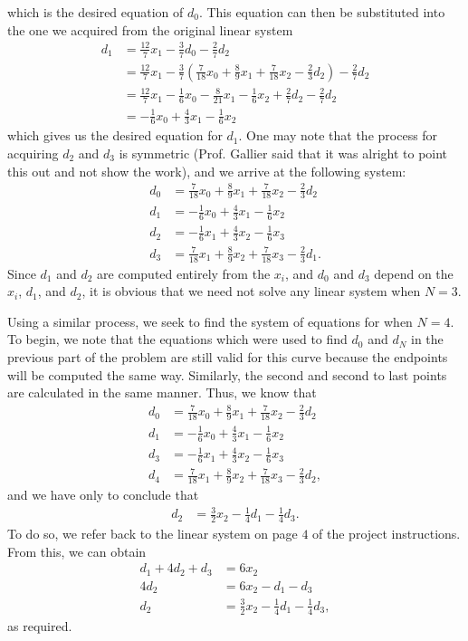 \documentclass[paper=a4, fontsize=11pt]{scrartcl} %
\begin{document}
which is the desired equation of $d_0$. This equation can then be substituted into the one we acquired from the original linear system
\begin{align*}
    d_1 &=
    \frac{12}{7}x_1 - \frac{3}{7}d_0 - \frac{2}{7} d_2 \\
    &=
    \frac{12}{7}x_1 - \frac{3}{7}(\frac{7}{18}x_0 + \frac{8}{9}x_1 +         \frac{7}{18}x_2 - \frac{2}{3}d_2) - \frac{2}{7} d_2 \\
    &=
    \frac{12}{7}x_1 - \frac{1}{6}x_0 - \frac{8}{21}x_1 - \frac{1}        {6}x_2     + \frac{2}{7}d_2 - \frac{2}{7} d_2 \\
    &=
    - \frac{1}{6}x_0 + \frac{4}{3}x_1 - \frac{1}{6}x_2
\end{align*}
which gives us the desired equation for $d_1$. One may note that the process
for acquiring $d_2$ and $d_3$ is symmetric (Prof. Gallier said that it was
alright to point this out and not show the work), and we arrive at the
following system:
\begin{align*}
    d_0 &=
    \frac{7}{18}x_0 +\frac{8}{9}x_1 +\frac{7}{18}x_2 -\frac{2}{3}d_2\\
    d_1 &=
    -\frac{1}{6}x_0 + \frac{4}{3}x_1 - \frac{1}{6}x_2 \\
    d_2 &=
    -\frac{1}{6}x_1 + \frac{4}{3}x_2 - \frac{1}{6}x_3 \\
    d_3 &=
    \frac{7}{18}x_1 +\frac{8}{9}x_2 +\frac{7}{18}x_3 -\frac{2}{3}d_1.
\end{align*}
Since $d_1$ and $d_2$ are computed entirely from the $x_i$, and $d_0$ and $d_3$
depend on the $x_i$, $d_1$, and $d_2$, it is obvious that we need not solve any
linear system when $N=3$.

Using a similar process, we seek to find the system of equations for when
$N=4$. To begin, we note that the equations which were used to find $d_0$ and
$d_N$ in the previous part of the problem are still valid for this curve
because the endpoints will be computed the same way. Similarly, the second and
second to last points are calculated in the same manner. Thus, we know that
\begin{align*}
    d_0 &=
    \frac{7}{18}x_0 +\frac{8}{9}x_1 +\frac{7}{18}x_2 -\frac{2}{3}d_2\\
    d_1 &=
    -\frac{1}{6}x_0 + \frac{4}{3}x_1 - \frac{1}{6}x_2 \\
    d_3 &=
    -\frac{1}{6}x_1 + \frac{4}{3}x_2 - \frac{1}{6}x_3 \\
    d_4 &=
    \frac{7}{18}x_1 +\frac{8}{9}x_2 +\frac{7}{18}x_3 -\frac{2}{3}d_2,
\end{align*}
and we have only to conclude that
\begin{align*}
    d_2 &=
    \frac{3}{2}x_2 - \frac{1}{4}d_1 - \frac{1}{4}d_3.
\end{align*}
To do so, we refer back to the linear system on page $4$ of the project instructions. From this, we can obtain
\begin{align*}
    d_1 + 4d_2 + d_3 &=
    6x_2 \\
    4d_2 &=
    6x_2 - d_1 - d_3 \\
    d_2 &=
    \frac{3}{2}x_2 - \frac{1}{4}d_1 - \frac{1}{4}d_3,
\end{align*}
as required.
\end{document}
